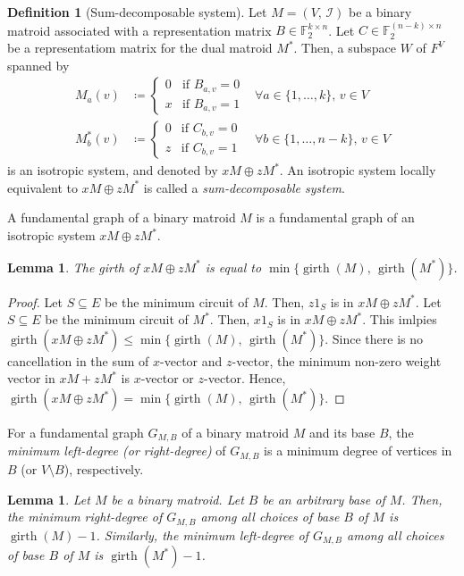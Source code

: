 \documentclass[twoside,10pt]{article}
\DeclareMathOperator{\girth}{girth}
\newtheorem{lemma}[theorem]{Lemma}
\theoremstyle{definition}
\newtheorem{definition}[theorem]{Definition}
\theoremstyle{remark}
\begin{document}
\begin{definition}[Sum-decomposable system]
Let $M=(V,\,\mathcal{I})$ be a binary matroid associated with a representation matrix $B\in\mathbb{F}_2^{k\times n}$.
Let $C\in\mathbb{F}_2^{(n-k)\times n}$ be a representatiom matrix for the dual matroid $M^*$.
Then, a subspace $W$ of $F^V$ spanned by
\begin{align*}
M_a(v)&\coloneqq \begin{cases}
0&\text{if } B_{a, v} = 0\\
x&\text{if } B_{a, v} = 1
\end{cases}&\forall a\in\{1,\dotsc,k\},\,v\in V\\
M^*_b(v)&\coloneqq \begin{cases}
0&\text{if } C_{b, v} = 0\\
z&\text{if } C_{b, v} = 1
\end{cases}&\forall b\in\{1,\dotsc,n-k\},\,v\in V
\end{align*}
is an isotropic system, and denoted by $xM\oplus zM^*$.
An isotropic system locally equivalent to $xM\oplus zM^*$ is called a \textit{sum-decomposable system}.
\end{definition}

A fundamental graph of a binary matroid $M$ is a fundamental graph of an isotropic system $xM\oplus zM^*$.

\begin{lemma}
The girth of $xM\oplus zM^*$ is equal to $\min\{\girth(M),\,\girth(M^*)\}$.
\end{lemma}
\begin{proof}
Let $S\subseteq E$ be the minimum circuit of $M$.
Then, $z1_S$ is in $xM\oplus zM^*$.
Let $S\subseteq E$ be the minimum circuit of $M^*$.
Then, $x1_S$ is in $xM\oplus zM^*$.
This imlpies $\girth(xM\oplus zM^*)\le \min\{\girth(M),\,\girth(M^*)\}$.
Since there is no cancellation in the sum of $x$-vector and $z$-vector, the minimum non-zero weight vector in $xM+zM^*$ is $x$-vector or $z$-vector.
Hence, $\girth(xM\oplus zM^*)= \min\{\girth(M),\,\girth(M^*)\}$.
\end{proof}

For a fundamental graph $G_{M,B}$ of a binary matroid $M$ and its base $B$, the \textit{minimum left-degree (or right-degree)} of $G_{M,B}$ is a minimum degree of vertices in $B$ (or $V\setminus B$), respectively.

\begin{lemma}
Let $M$ be a binary matroid.
Let $B$ be an arbitrary base of $M$.
Then, the minimum right-degree of $G_{M,B}$ among all choices of base $B$ of $M$ is $\girth(M)-1$.
Similarly, the minimum left-degree of $G_{M,B}$ among all choices of base $B$ of $M$ is $\girth(M^*)-1$.
\end{lemma}
\end{document}
